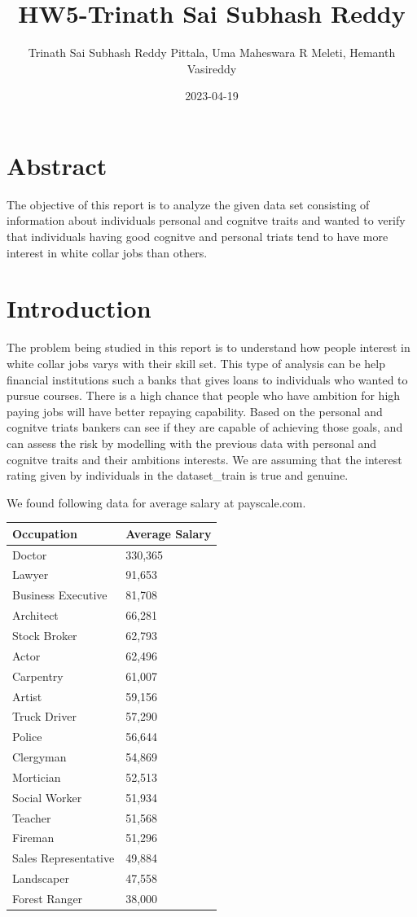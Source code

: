 \documentclass[
]{article}
\title{HW5-Trinath Sai Subhash Reddy}
\author{Trinath Sai Subhash Reddy Pittala, Uma Maheswara R Meleti,
Hemanth Vasireddy}
\date{2023-04-19}
\begin{document}
\maketitle

\hypertarget{abstract}{%
\section{Abstract}\label{abstract}}

The objective of this report is to analyze the given data set consisting
of information about individuals personal and cognitve traits and wanted
to verify that individuals having good cognitve and personal triats tend
to have more interest in white collar jobs than others.

\hypertarget{introduction}{%
\section{Introduction}\label{introduction}}

The problem being studied in this report is to understand how people
interest in white collar jobs varys with their skill set. This type of
analysis can be help financial institutions such a banks that gives
loans to individuals who wanted to pursue courses. There is a high
chance that people who have ambition for high paying jobs will have
better repaying capability. Based on the personal and cognitve triats
bankers can see if they are capable of achieving those goals, and can
assess the risk by modelling with the previous data with personal and
cognitve traits and their ambitions interests. We are assuming that the
interest rating given by individuals in the dataset\_train is true and
genuine.

We found following data for average salary at payscale.com.

\begin{longtable}[]{@{}ll@{}}
\toprule()
Occupation & Average Salary \\
\midrule()
\endhead
Doctor & 330,365 \\
Lawyer & 91,653 \\
Business Executive & 81,708 \\
Architect & 66,281 \\
Stock Broker & 62,793 \\
Actor & 62,496 \\
Carpentry & 61,007 \\
Artist & 59,156 \\
Truck Driver & 57,290 \\
Police & 56,644 \\
Clergyman & 54,869 \\
Mortician & 52,513 \\
Social Worker & 51,934 \\
Teacher & 51,568 \\
Fireman & 51,296 \\
Sales Representative & 49,884 \\
Landscaper & 47,558 \\
Forest Ranger & 38,000 \\
\bottomrule()
\end{longtable}
\end{document}
